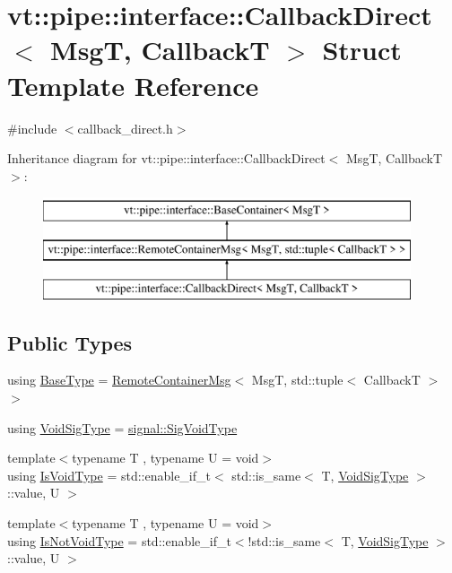 \hypertarget{structvt_1_1pipe_1_1interface_1_1_callback_direct}{}\section{vt\+:\+:pipe\+:\+:interface\+:\+:Callback\+Direct$<$ MsgT, CallbackT $>$ Struct Template Reference}
\label{structvt_1_1pipe_1_1interface_1_1_callback_direct}


{\ttfamily \#include $<$callback\+\_\+direct.\+h$>$}

Inheritance diagram for vt\+:\+:pipe\+:\+:interface\+:\+:Callback\+Direct$<$ MsgT, CallbackT $>$\+:\begin{figure}[H]
\begin{center}
\leavevmode
\includegraphics[height=3.000000cm]{structvt_1_1pipe_1_1interface_1_1_callback_direct}
\end{center}
\end{figure}
\subsection*{Public Types}
\begin{DoxyCompactItemize}
\item 
using \hyperlink{structvt_1_1pipe_1_1interface_1_1_callback_direct_ad166e55f0ac9ace4c87120e0acbeedb0}{Base\+Type} = \hyperlink{structvt_1_1pipe_1_1interface_1_1_remote_container_msg}{Remote\+Container\+Msg}$<$ MsgT, std\+::tuple$<$ CallbackT $>$ $>$
\item 
using \hyperlink{structvt_1_1pipe_1_1interface_1_1_callback_direct_ae35dd09260d13dbdd8444a208e552070}{Void\+Sig\+Type} = \hyperlink{namespacevt_1_1pipe_1_1signal_acbe257d1ae44f20fa9fd9b6ed3057caf}{signal\+::\+Sig\+Void\+Type}
\item 
{\footnotesize template$<$typename T , typename U  = void$>$ }\\using \hyperlink{structvt_1_1pipe_1_1interface_1_1_callback_direct_a404a37ff25faa985a51a410ec70b4900}{Is\+Void\+Type} = std\+::enable\+\_\+if\+\_\+t$<$ std\+::is\+\_\+same$<$ T, \hyperlink{structvt_1_1pipe_1_1interface_1_1_callback_direct_ae35dd09260d13dbdd8444a208e552070}{Void\+Sig\+Type} $>$\+::value, U $>$
\item 
{\footnotesize template$<$typename T , typename U  = void$>$ }\\using \hyperlink{structvt_1_1pipe_1_1interface_1_1_callback_direct_a619c2c4c96ec2573b87b992344c48826}{Is\+Not\+Void\+Type} = std\+::enable\+\_\+if\+\_\+t$<$!std\+::is\+\_\+same$<$ T, \hyperlink{structvt_1_1pipe_1_1interface_1_1_callback_direct_ae35dd09260d13dbdd8444a208e552070}{Void\+Sig\+Type} $>$\+::value, U $>$
\end{DoxyCompactItemize}

